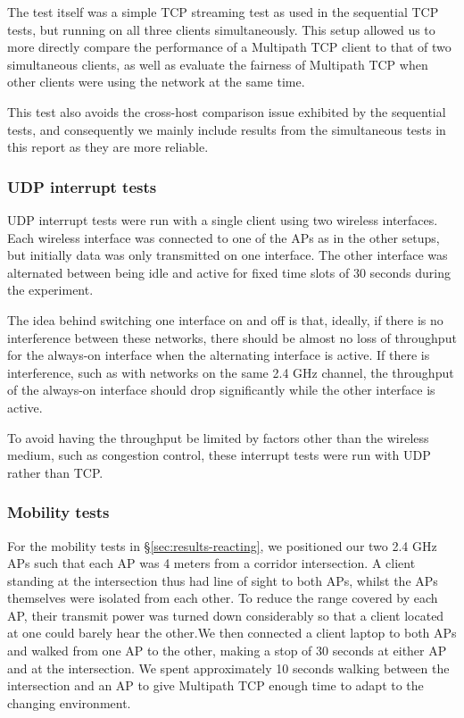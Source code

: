 The test itself was a simple TCP streaming test as used in the sequential TCP
tests, but running on all three clients simultaneously. This setup allowed us to
more directly compare the performance of a Multipath TCP client to that of two
simultaneous clients, as well as evaluate the fairness of Multipath TCP when
other clients were using the network at the same time.

This test also avoids the cross-host comparison issue exhibited by the
sequential tests, and consequently we mainly include results from the
simultaneous tests in this report as they are more reliable.

\subsubsection{UDP interrupt tests}
\label{sec:met:setups:intudp}
UDP interrupt tests were run with a single client using two wireless interfaces.
Each wireless interface was connected to one of the APs as in the other setups,
but initially data was only transmitted on one interface. The other interface
was alternated between being idle and active for fixed time slots of 30 seconds
during the experiment.

The idea behind switching one interface on and off is that, ideally, if there is
no interference between these networks, there should be almost no loss of
throughput for the always-on interface when the alternating interface is active.
If there is interference, such as with networks on the same 2.4 GHz channel, the
throughput of the always-on interface should drop significantly while the other
interface is active.

To avoid having the throughput be limited by factors other than the wireless
medium, such as congestion control, these interrupt tests were run with UDP
rather than TCP.

\subsubsection{Mobility tests}
\label{sec:met:setups:mobility}
For the mobility tests in \S\ref{sec:results-reacting}, we positioned our two
2.4 GHz APs such that each AP was 4 meters from a corridor intersection. A
client standing at the intersection thus had line of sight to both APs, whilst
the APs themselves were isolated from each other. To reduce the range covered by
each AP, their transmit power was turned down considerably so that a client
located at one could barely hear the other.\@ We then connected a client laptop
to both APs and walked from one AP to the other, making a stop of 30 seconds at
either AP and at the intersection. We spent approximately 10 seconds walking
between the intersection and an AP to give Multipath TCP enough time to adapt to
the changing environment.

